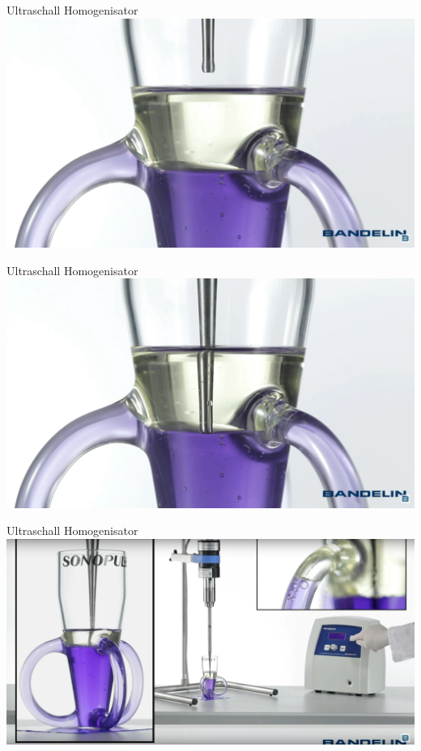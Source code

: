 \documentclass{beamer} %
\begin{document}
\begin{frame}{Ultraschall Homogenisator}
	\centering
	\includegraphics[width=\linewidth]{Markus/uh1}
\end{frame}
\begin{frame}{Ultraschall Homogenisator}
	\centering
	\includegraphics[width=\linewidth]{Markus/uh2}
\end{frame}
\begin{frame}{Ultraschall Homogenisator}
	\centering
	\includegraphics[width=\linewidth]{Markus/uh3}
\end{frame}
\end{document}
